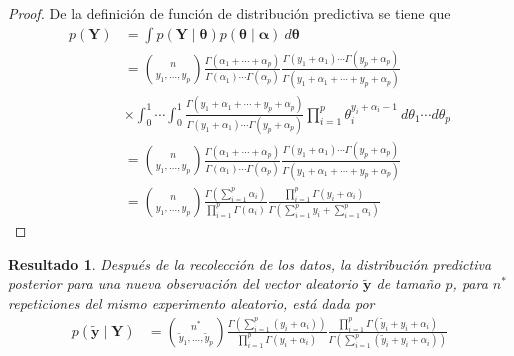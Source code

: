 \documentclass[
  10pt,
  spanish,
]{book}
\newtheorem{proposition}{Resultado}[chapter]
\theoremstyle{definition}
\theoremstyle{definition}
\theoremstyle{definition}
\theoremstyle{definition}
\theoremstyle{remark}
\begin{document}
\begin{proof}
{}De la definición de función de distribución predictiva se tiene que
\begin{align*}
p(\mathbf{Y})&=\int p(\mathbf{Y} \mid \boldsymbol \theta)p(\boldsymbol \theta\mid \boldsymbol \alpha)\ d\boldsymbol \theta\\
&=\binom{n}{y_1,\ldots,y_p} \frac{\Gamma(\alpha_1+\cdots+\alpha_p)}{\Gamma(\alpha_1)\cdots\Gamma(\alpha_p)}
\frac{\Gamma(y_1+\alpha_1)\cdots\Gamma(y_p+\alpha_p)}{\Gamma(y_1+\alpha_1+\cdots + y_p+\alpha_p)}\\
&\times
\int_0^1 \cdots \int_0^1 \frac{\Gamma(y_1+\alpha_1+\cdots+y_p+\alpha_p)}{\Gamma(y_1+\alpha_1)\cdots\Gamma(y_p+\alpha_p)}
\prod_{i=1}^p\theta_i^{y_i+\alpha_i-1} \ d\theta_1 \cdots d\theta_p\\
&=\binom{n}{y_1,\ldots,y_p} \frac{\Gamma(\alpha_1+\cdots+\alpha_p)}{\Gamma(\alpha_1)\cdots\Gamma(\alpha_p)}
\frac{\Gamma(y_1+\alpha_1)\cdots\Gamma(y_p+\alpha_p)}{\Gamma(y_1+\alpha_1+\cdots + y_p+\alpha_p)}\\
&=\binom{n}{y_1,\ldots,y_p} \frac{\Gamma(\sum_{i=1}^p\alpha_i)}{\prod_{i=1}^p\Gamma(\alpha_i)}
\frac{\prod_{i=1}^p\Gamma(y_i+\alpha_i)}{\Gamma(\sum_{i=1}^py_i+\sum_{i=1}^p\alpha_i)}
\end{align*}
\end{proof}

\begin{proposition}
\protect\hypertarget{prp:unnamed-chunk-68}{}{\label{prp:unnamed-chunk-68} }Después de la recolección de los datos, la distribución predictiva posterior para una nueva observación del vector aleatorio \(\tilde{\mathbf{y}}\) de tamaño \(p\), para \(n^*\) repeticiones del mismo experimento aleatorio, está dada por
\begin{align}
p(\tilde{\mathbf{y}} \mid \mathbf{Y})&=
  \binom{n^*}{\tilde{y}_1,\ldots,\tilde{y}_p} \frac{\Gamma(\sum_{i=1}^p(y_i+\alpha_i))}{\prod_{i=1}^p\Gamma(y_i+\alpha_i)}
\frac{\prod_{i=1}^p\Gamma(\tilde{y}_i+y_i+\alpha_i)}{\Gamma(\sum_{i=1}^p(\tilde{y}_i+y_i+\alpha_i))}
\end{align}
\end{proposition}
\end{document}

